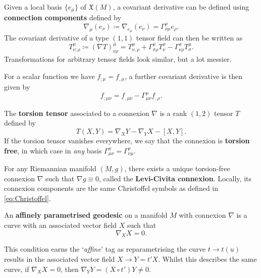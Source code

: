 \documentclass[12pt]{article}
\begin{document}
\begin{definition}
	Given a local basis $\{e_\mu \}$ of $\mathfrak{X}(M)$, a covariant derivative can be defined using \textbf{connection components} defined by
		\begin{equation}
			\nabla_\mu (e_\nu) \coloneqq \nabla_{e_\mu} (e_\nu) = \Gamma^\rho_{\nu\mu} e_\rho.
		\end{equation}
	The covariant derivative of a type $(1,1)$ tensor field can then be written as
		\begin{equation}
			T^{\mu}_{\nu ; \rho} \coloneqq (\nabla T)^\mu_{\nu \rho} = T^\mu_{\nu, \rho} + \Gamma^\mu_{\sigma \rho} T^\sigma_\nu - \Gamma^\sigma_{\nu \rho} T^\mu_\sigma.
		\end{equation}
	Transformations for arbitrary tensor fields look similar, but a lot messier.
\end{definition}
\begin{remark}
	For a scalar function we have $f_{; \mu} = f_{,\mu}$, a further covariant derivative is then given by
		\begin{equation}
			f_{;\mu\nu} = f_{,\mu\nu} - \Gamma ^\rho_{\mu\nu} f_{,\rho}.
		\end{equation}
\end{remark}

\begin{definition}[Torsion]
	The \textbf{torsion tensor} associated to a connexion $\nabla$ is a rank $(1,2)$ tensor $T$ defined by
		\begin{equation}
			T(X,Y) = \nabla_X Y - \nabla_Y X - [X,Y].
		\end{equation}
	If the torsion tensor vanishes everywhere, we say that the connexion is \textbf{torsion free}, in which case in \textit{any} basis $\Gamma^\rho_{\mu \nu} = \Gamma^\rho_{\nu\mu}$.
\end{definition}

\begin{theorem}
	For any Riemannian manifold $(M,g)$, there exists a unique torsion-free connexion $\nabla$ such that $\nabla g \equiv 0$, called the \textbf{Levi-Civita connexion}. Locally, its connexion components are the same Christoffel symbols as defined in \eqref{eq:Christoffel}.
\end{theorem}

\begin{definition}
	An \textbf{affinely parametrised geodesic} on a manifold $M$ with connexion $\nabla$ is a curve with an associated vector field $X$ such that
		\begin{equation}
			\nabla_X X = 0.
		\end{equation}
\end{definition}
\begin{remark}
	This condition earns the `\textit{affine}' tag as reparametrising the curve $t \to t(u)$ results in the associated vector field $X \to Y = t' X$. Whilst this describes the same curve, if $\nabla_X X = 0$, then $\nabla_Y Y = (X \circ t') Y \neq 0$.
\end{remark}
\end{document}

